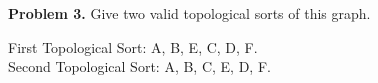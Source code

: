 \documentclass{article}
\begin{document}
\vspace*{10mm}\par\textbf{Problem 3.} Give two valid topological sorts of this graph.\par

First Topological Sort: A, B, E, C, D, F. 
\\Second Topological Sort: A, B, C, E, D, F.
\end{document}
